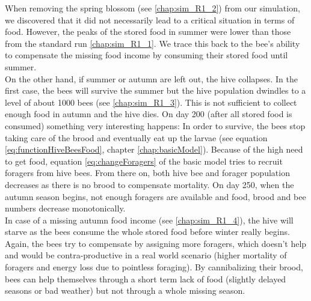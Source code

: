 		When removing the spring blossom (see \ref{chap:sim_R1_2}) from our simulation, we discovered that it did not necessarily lead to a critical situation in terms of food. However, the peaks of the stored food in summer were lower than those from the standard run \ref{chap:sim_R1_1}. We trace this back to the bee's ability to compensate the missing food income by consuming their stored food until summer.\\
		
		On the other hand, if summer or autumn are left out, the hive collapses. In the first case, the bees will survive the summer but the hive population dwindles to a level of about 1000 bees (see \ref{chap:sim_R1_3}). This is not sufficient to collect enough food in  autumn and the hive dies. On day 200 (after all stored food is consumed) something very interesting happens: In order to survive, the bees stop taking care of the brood and eventually eat up the larvae (see equation \ref{eq:functionHiveBeesFood}, chapter \ref{chap:basicModel}). Because of the high need to get food, equation \ref{eq:changeForagers} of the basic model tries to recruit foragers from hive bees. From there on, both hive bee and forager population decreases as there is no brood to compensate mortality. On day 250, when the autumn season begins, not enough foragers are available and food, brood and bee numbers decrease monotonically.\\
		
		In case of a missing autumn food income (see \ref{chap:sim_R1_4}), the hive will starve as the bees consume the whole stored food before winter really begins. Again, the bees try to compensate by assigning more foragers, which doesn't help and would be contra-productive in a real world scenario (higher mortality of foragers and energy loss due to pointless foraging).
		By cannibalizing their brood, bees can help themselves through a short term lack of food (slightly delayed seasons or bad weather) but not through a whole missing season.
		
